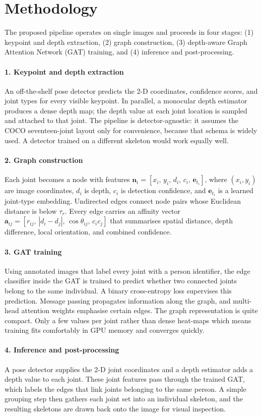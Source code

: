 \section{Methodology}

The proposed pipeline operates on single images and proceeds in four stages:
(1) keypoint and depth extraction, (2) graph construction, (3) depth-aware
Graph Attention Network (GAT) training, and (4) inference and post-processing.

\paragraph*{1. Keypoint and depth extraction} An off-the-shelf pose detector
predicts the 2-D coordinates, confidence scores, and joint types for every
visible keypoint. In parallel, a monocular depth estimator produces a dense
depth map; the depth value at each joint location is sampled and attached to
that joint. The pipeline is detector-agnostic: it assumes the COCO
seventeen-joint layout only for convenience, because that schema is widely
used. A detector trained on a different skeleton would work equally well.

\paragraph*{2. Graph construction} Each joint becomes
a node with features $\mathbf{n}_i=[x_i,\,y_i,\,d_i,\,c_i,\,\mathbf{e}_{t_i}]$,
where $(x_i,y_i)$ are image coordinates, $d_i$ is depth, $c_i$ is detection
confidence, and $\mathbf{e}_{t_i}$ is a learned joint-type embedding.
Undirected edges connect node pairs whose Euclidean distance is below $\tau_r$.
Every edge carries an affinity vector
$\mathbf{a}_{ij}=[r_{ij},\,|d_i-d_j|,\,\cos\theta_{ij},\,c_i c_j]$ that
summarises spatial distance, depth difference, local orientation, and combined
confidence.

\paragraph*{3. GAT training} Using annotated images that label every joint with
a person identifier, the edge classifier inside the GAT is trained to predict
whether two connected joints belong to the same individual. A binary
cross-entropy loss supervises this prediction. Message passing propagates
information along the graph, and multi-head attention weights emphasise certain
edges. The graph representation is quite compact. Only a few values per joint
rather than dense heat-maps which means training fits comfortably in GPU memory
and converges quickly.

\paragraph*{4. Inference and post-processing} A pose detector
supplies the 2-D joint coordinates and a depth estimator adds a depth value to
each joint. These joint features pass through the trained GAT, which labels the
edges that link joints belonging to the same person. A simple grouping step
then gathers each joint set into an individual skeleton, and the resulting
skeletons are drawn back onto the image for visual inspection.